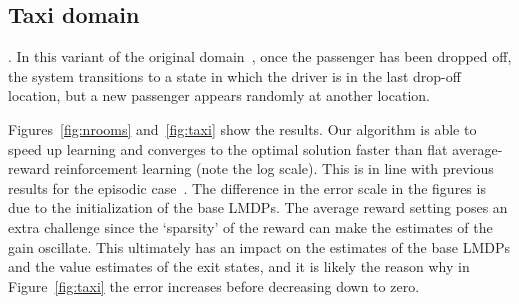   \subsection{Taxi domain}. In this variant of the original domain~\citep{Dietterich2000}, once the passenger has been dropped off, the system transitions to a state in which the driver is in the last drop-off location, but a new passenger appears randomly at another location. %
  

Figures~\ref{fig:nrooms} and~\ref{fig:taxi} show the results. Our algorithm is able to speed up 
learning and converges to the optimal solution faster than flat average-reward reinforcement learning (note the log scale). This is in line with previous results for the episodic case~\citep{Infante2022}. The difference in the error scale in the figures is due to the initialization of the base LMDPs. The average reward setting poses an extra challenge since the `sparsity' of the reward can make the estimates of the gain oscillate. This ultimately has an impact on the estimates of the base LMDPs and the value estimates of the exit states, and it is likely the reason why in Figure~\ref{fig:taxi} the error increases before decreasing down to zero.




